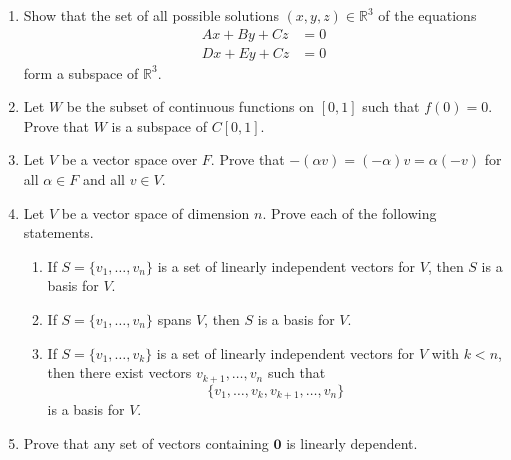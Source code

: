 {\begin{enumerate}
\begin{enumerate}
  \item
$\{ (x_1, x_2, x_3) : 3 x_1 + 4 x_3 = 0, 2 x_1 - x_2 + x_3 = 0 \}$

  \item
$\{ (x_1, x_2, x_3) : x_1 - 2 x_2 + 2 x_3 = 2 \}$

  \item
$\{ (x_1, x_2, x_3) : 3 x_1 - 2 x_2^2 = 0 \}$

\end{enumerate}


\item
Show that the set of all possible solutions $(x, y, z) \in {\mathbb R}^3$
of the equations
\begin{align*}
Ax + B y + C z & =  0 \\
D x + E y + C z & =  0
\end{align*}
form a subspace of ${\mathbb R}^3$.


\item
Let $W$ be the subset of continuous functions on $[0, 1]$ such that
$f(0) = 0$.  Prove that $W$ is a subspace of $C[0, 1]$.




\item
Let $V$ be a vector space over $F$. Prove that $-(\alpha v) =
(-\alpha)v = \alpha(-v)$ for all $\alpha \in F$ and all $v \in V$. 


\item
Let $V$ be a vector space of dimension $n$. Prove each of the
following statements. 
\begin{enumerate}

 \item
If $S = \{v_1, \ldots, v_n \}$ is a set of linearly independent
vectors for $V$, then $S$ is a basis for $V$. 

 \item
If $S = \{v_1, \ldots, v_n \}$ spans $V$, then $S$ is a basis for $V$.

 \item 
If $S = \{v_1, \ldots, v_k \}$ is a set of linearly independent
vectors for $V$ with $k < n$, then there exist vectors $v_{k+1},
\ldots, v_n$ such that 
\[
\{v_1, \ldots, v_k, v_{k+1}, \ldots, v_n \}
\] 
is a basis for $V$. 

\end{enumerate}


\item
Prove that any set of vectors containing ${\mathbf 0}$ is linearly
dependent. 



\end{enumerate}}
